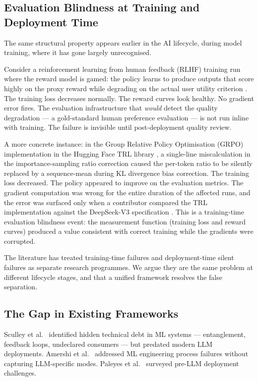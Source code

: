 \documentclass{article}
\begin{document}
\subsection{Evaluation Blindness at Training and Deployment Time}

The same structural property appears earlier in the AI lifecycle, during model
training, where it has gone largely unrecognised.

Consider a reinforcement learning from human feedback (RLHF) training run where
the reward model is gamed: the policy learns to produce outputs that score highly
on the proxy reward while degrading on the actual user utility criterion
\citep{gao2025rewardhacking, stiennon2020learning}.  The training loss decreases
normally.  The reward curves look healthy.  No gradient error fires.  The
evaluation infrastructure that \emph{would} detect the quality degradation ---
a gold-standard human preference evaluation --- is not run inline with training.
The failure is invisible until post-deployment quality review.

A more concrete instance: in the Group Relative Policy Optimisation (GRPO)
implementation in the Hugging Face TRL library \citep{trl2024grpo}, a
single-line miscalculation in the importance-sampling ratio correction caused
the per-token ratio to be silently replaced by a sequence-mean during KL
divergence bias correction.  The training loss decreased.  The policy appeared
to improve on the evaluation metrics.  The gradient computation was wrong for
the entire duration of the affected runs, and the error was surfaced only when
a contributor compared the TRL implementation against the DeepSeek-V3
specification \citep{shao2024deepseekmath}.  This is a training-time evaluation
blindness event: the measurement function (training loss and reward curves)
produced a value consistent with correct training while the gradients were
corrupted.

The literature has treated training-time failures \citep{gao2025rewardhacking}
and deployment-time silent failures
\citep{shen2025silent, kumar2025deployment, liu2025blindspot} as separate
research programmes.  We argue they are the same problem at different lifecycle
stages, and that a unified framework resolves the false separation.

\subsection{The Gap in Existing Frameworks}

Sculley et al.\ \citep{sculley2015debt} identified hidden technical debt in ML
systems --- entanglement, feedback loops, undeclared consumers --- but predated
modern LLM deployments.  Amershi et al.\ \citep{amershi2019se4ml} addressed
ML engineering process failures without capturing LLM-specific modes.
Paleyes et al.\ \citep{paleyes2022challenges} surveyed pre-LLM deployment
challenges.
\end{document}
